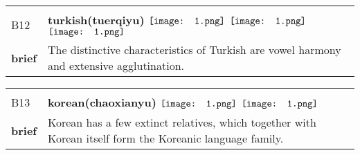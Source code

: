 \documentclass[UTF8]{article}
\begin{document}
            \begin{tabularx}{\textwidth}{p{1.5cm}X}
            \arrayrulecolor{myBlue}
        	\hline\\
            \small{B12}&
            \large{\bfseries{turkish(tuerqiyu)}}\hfill
                                                            \phantom{$\vcenter{\hbox{\texttt{[image: 1.png]}}}$}
                                                                \phantom{$\vcenter{\hbox{\texttt{[image: 1.png]}}}$}
                                                                $\vcenter{\hbox{\texttt{[image: 1.png]}}}$
                                                                $\vcenter{\hbox{\texttt{[image: 1.png]}}}$
                                                                \phantom{$\vcenter{\hbox{\texttt{[image: 1.png]}}}$}
                                                                $\vcenter{\hbox{\texttt{[image: 1.png]}}}$
                                                                \phantom{$\vcenter{\hbox{\texttt{[image: 1.png]}}}$}
                                        \\[10pt]
            \large{\bfseries{brief}}&\noindent\parbox[c]{\hsize}{The distinctive characteristics of Turkish are vowel harmony and extensive agglutination.} \\[5pt]
            \hline\\[-10pt]
        \end{tabularx}
            \begin{tabularx}{\textwidth}{p{1.5cm}X}
            \arrayrulecolor{myBlue}
        	\hline\\
            \small{B13}&
            \large{\bfseries{korean(chaoxianyu)}}\hfill
                                                            \phantom{$\vcenter{\hbox{\texttt{[image: 1.png]}}}$}
                                                                \phantom{$\vcenter{\hbox{\texttt{[image: 1.png]}}}$}
                                                                $\vcenter{\hbox{\texttt{[image: 1.png]}}}$
                                                                \phantom{$\vcenter{\hbox{\texttt{[image: 1.png]}}}$}
                                                                \phantom{$\vcenter{\hbox{\texttt{[image: 1.png]}}}$}
                                                                $\vcenter{\hbox{\texttt{[image: 1.png]}}}$
                                                                \phantom{$\vcenter{\hbox{\texttt{[image: 1.png]}}}$}
                                        \\[10pt]
            \large{\bfseries{brief}}&\noindent\parbox[c]{\hsize}{Korean has a few extinct relatives, which together with Korean itself form the Koreanic language family. } \\[5pt]
            \hline\\[-10pt]
        \end{tabularx}
\end{document}
